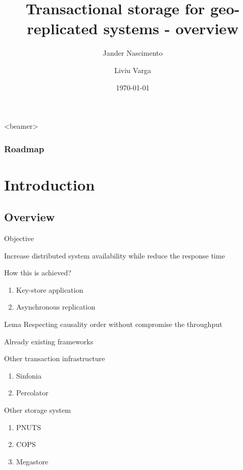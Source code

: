 \documentclass{beamer}
\title[Transactional storage for geo-replicated systems ]{Transactional storage for geo-replicated systems - overview}
\author{Jander Nascimento
\and Liviu Varga}
\institute{Université Joseph Fourier}
\date{\today}
\begin{document}
\begin{frame}
\titlepage
\end{frame}

{
  \begin{frame}<beamer>
    \frametitle{Roadmap}
    \tableofcontents%
  \end{frame}
}


\section{Introduction}

	\subsection{Overview}
	
		\begin{frame}{Objective}
		
			Increase distributed system availability while reduce the response time 
		
			How this is achieved?
			\begin{enumerate}
			\item Key-store application
			\item Asynchronous replication
			\end{enumerate}
			
			\begin{block}{Lema}
				Respecting causality order without compromise the throughput
			\end{block}
		
		\end{frame}	
			
		\begin{frame}{Already existing frameworks}
		
			Other transaction infrastructure					
		
			\begin{enumerate}
			\item Sinfonia
			\item Percolator
			\end{enumerate}						
					
			Other storage system
			\begin{enumerate}
			\item PNUTS
			\item COPS
			\item Megastore
			\end{enumerate}		

		\end{frame}
	
\end{document}
